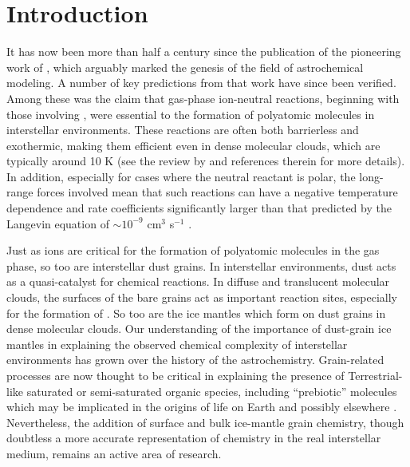 \documentclass[journal=aesccq,manuscript=article,layout=twocolumn]{achemso}
\begin{document}
\section{Introduction}

It has now been more than half a century since the publication of the pioneering work of \citet{herbst_formation_1973}, which arguably marked the genesis of the field of astrochemical modeling. A number of key predictions from that work have since been verified. Among these was the claim that gas-phase ion-neutral reactions, beginning with those involving , were essential to the formation of polyatomic molecules in interstellar environments. These reactions are often both barrierless and exothermic, making them efficient even in dense molecular clouds, which are typically around 10 K (see the review by \citet{ceccarelli_organic_2022} and references therein for more details). In addition, especially for cases where the neutral reactant is polar, the long-range forces involved mean that such reactions can have a negative temperature dependence \citep{woon_quantum_2009} and rate coefficients significantly larger than that predicted by the Langevin equation\citep{hammes_principles_1978} of $\sim10^{-9}$ cm$^3$ s$^{-1}$ . 

Just as ions are critical for the formation of polyatomic molecules in the gas phase, so too are interstellar dust grains. In interstellar environments, dust acts as a quasi-catalyst for chemical reactions. In diffuse and translucent molecular clouds, the surfaces of the bare grains act as important reaction sites, especially for the formation of  \citep{katz_molecular_1999,cazaux_molecular_2002,iqbal_h2_2014,acharyya_effect_2020}. So too are the ice mantles which form on dust grains in dense molecular clouds. 
Our understanding of the importance of dust-grain ice mantles in explaining the observed chemical complexity of interstellar environments has grown over the history of the astrochemistry. Grain-related processes are now thought to be critical in explaining the presence of Terrestrial-like saturated or semi-saturated organic species, including ``prebiotic'' molecules which may be implicated in the origins of life on Earth and possibly elsewhere \citep{ceccarelli_organic_2022}. Nevertheless, the addition of surface and bulk ice-mantle grain chemistry, though doubtless a more accurate representation of chemistry in the real interstellar medium, remains an active area of research.
\end{document}
